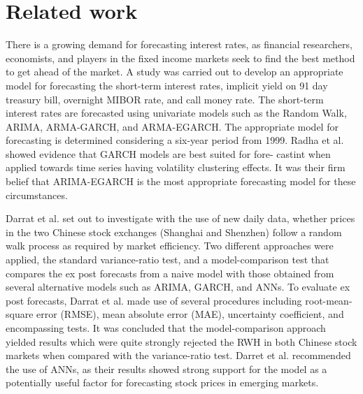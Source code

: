 \documentclass[times]{jtitauth}
\begin{document}
\section{Related work}

There is a growing demand for forecasting interest rates, as financial researchers, economists, and players in the fixed income markets seek to find the best method to get ahead of the market. A study was carried out to develop an appropriate model for forecasting the short-term interest rates, implicit yield on 91 day treasury bill, overnight MIBOR rate, and call money rate. The short-term interest rates are forecasted using univariate models such as the Random Walk, ARIMA, ARMA-GARCH, and ARMA-EGARCH. The appropriate model for forecasting is determined considering a six-year period from 1999. Radha et al. showed evidence that GARCH models are best suited for fore- castint when applied towards time series having volatility clustering effects. It was their firm belief that ARIMA-EGARCH is the most appropriate forecasting model for these circumstances.

Darrat et al. set out to investigate with the use of new daily data, whether prices in the two Chinese stock exchanges (Shanghai and Shenzhen) follow a random walk process as required by market efficiency. Two different approaches were applied, the standard variance-ratio test, and a model-comparison test that compares the ex post forecasts from a naive model with those obtained from several alternative models such as ARIMA, GARCH, and ANNs. To evaluate ex post forecasts, Darrat et al. made use of several procedures including root-mean-square error (RMSE), mean absolute error (MAE), uncertainty coefficient, and encompassing tests. It was concluded that the model-comparison approach yielded results which were quite strongly rejected the RWH in both Chinese stock markets when compared with the variance-ratio test. Darret et al. recommended the use of ANNs, as their results showed strong support for the model
as a potentially useful factor for forecasting stock prices in emerging markets.
\end{document}
